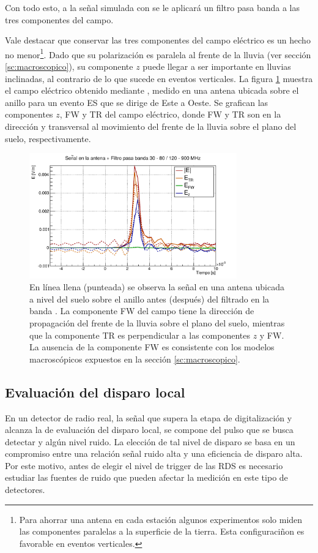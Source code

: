 	Con todo esto, a la se\~nal simulada con \zhs{} se le aplicar\'a un filtro pasa banda  a las tres componentes del campo.
	
	Vale destacar que conservar las tres componentes del campo el\'ectrico es un hecho no menor\footnote{Para ahorrar una antena en cada estaci\'on algunos experimentos solo miden las componentes paralelas a la superficie de la tierra. Esta configuraci\~non es favorable en eventos verticales.}.
	Dado que su polarizaci\'on es paralela al frente de la lluvia (ver secci\'on \ref{sc:macroscopico}), su componente $z$ puede llegar a ser importante en lluvias inclinadas, al contrario de lo que sucede en eventos verticales.
	La figura \ref{fig:antSig} muestra el campo el\'ectrico obtenido mediante \zhs{}, medido en una antena ubicada sobre el anillo \cher{} para un evento ES que se dirige de Este a Oeste.
	Se grafican las componentes $z$, FW y TR del campo eléctrico, donde FW y TR son en la direcci\'on y transversal al movimiento del frente de la lluvia sobre el plano del suelo, respectivamente.
	
	\begin{figure}[ht!]
		\centering
		\includegraphics[width=0.8\textwidth]{./fig/simulacionRadio/antennaFilt}
		\caption{\label{fig:antSig}
		En l\'inea llena (punteada) se observa la señal en una antena ubicada a nivel del suelo sobre el anillo \cher{} antes (despu\'es) del filtrado en la banda .  
		La componente FW del campo tiene la direcci\'on de propagaci\'on del frente de la lluvia sobre el plano del suelo, mientras que la componente TR es perpendicular a las componentes $z$ y FW.
		La ausencia de la componente FW es consistente con los modelos macrosc\'opicos expuestos en la secci\'on \ref{sc:macroscopico}.
		}
	\end{figure}
	
	\subsection{Evaluaci\'on del disparo local}
	\label{sbsc:localTriggerRadio}
	En un detector de radio real, la se\~nal que supera la etapa de digitalizaci\'on y alcanza la de evaluaci\'on del disparo local, se compone del pulso que se busca detectar y alg\'un nivel ruido.
	La elecci\'on de tal nivel de disparo se basa en un compromiso entre una relaci\'on se\~nal ruido alta y una eficiencia de disparo alta.
	Por este motivo, antes de elegir el nivel de trigger de las RDS es necesario estudiar las fuentes de ruido que pueden afectar la medici\'on en este tipo de detectores.
	
